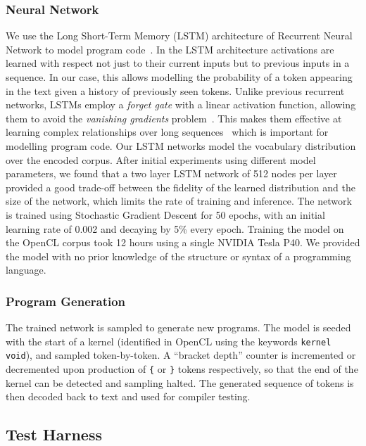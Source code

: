 \subsubsection{Neural Network}

We use the Long Short-Term Memory (LSTM) architecture of Recurrent Neural
Network to model program code~\cite{Hochreiter1997}. In the LSTM architecture
activations are learned with respect not just to their current inputs but to
previous inputs in a sequence. In our case, this allows modelling the probability
of a token appearing in the text given a history of previously seen tokens.
Unlike previous recurrent networks, LSTMs employ a \emph{forget gate} with a
linear activation function, allowing them to avoid the \emph{vanishing
gradients} problem~\cite{Pacanu2013}. This makes them effective at learning
complex relationships over long sequences~\cite{Lipton2015} which is important
for modelling program code. Our LSTM networks model the vocabulary distribution
over the encoded corpus. After initial experiments using different model
parameters, we found that a two layer LSTM network of 512 nodes per layer
provided a good trade-off between the fidelity of the learned distribution and
the size of the network, which limits the rate of training and inference. The
network is trained using Stochastic Gradient Descent for 50 epochs, with an
initial learning rate of 0.002 and decaying by 5\% every epoch. Training the
model on the OpenCL corpus took 12 hours using a single NVIDIA Tesla P40. We
provided the model with no prior knowledge of the structure or syntax of a
programming language.

\subsubsection{Program Generation}

The trained network is sampled to generate new programs. The model is seeded
with the start of a kernel (identified in OpenCL using the keywords
\texttt{kernel void}), and sampled token-by-token. A ``bracket depth'' counter
is incremented or decremented upon production of \texttt{\{} or \texttt{\}}
tokens respectively, so that the end of the kernel can be detected and sampling
halted. The generated sequence of tokens is then decoded back to text and used
for compiler testing.


\subsection{Test Harness\label{sec:test-harness}}

